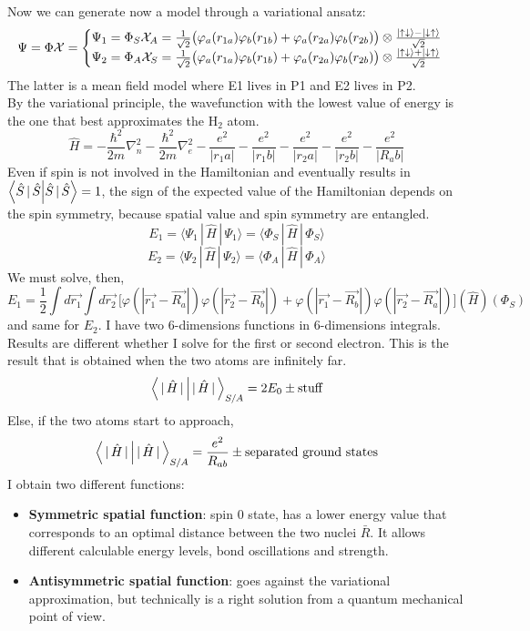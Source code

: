 Now we can generate now a model through a variational ansatz:
\[
\Psi=\Phi \mathcal{X}=\begin{cases}
\Psi_1=\Phi_S \mathcal{X}_A = \frac{1}{\sqrt{2}} \big(\varphi_a(r_{1a}) \varphi_b (r_{1b})+\varphi_a (r_{2a}) \varphi_b (r_{2b})\big) \otimes\frac{\ket{\uparrow\downarrow}-\ket{\downarrow\uparrow}}{\sqrt{2}}\\
\Psi_2=\Phi_A\mathcal{X}_S = \frac{1}{\sqrt{2}} \big(\varphi_a(r_{1a}) \varphi_b (r_{1b})+\varphi_a (r_{2a}) \varphi_b (r_{2b})\big) \otimes\frac{\ket{\uparrow\downarrow}+\ket{\downarrow\uparrow}}{\sqrt{2}}\\
\end{cases}
\]
The latter is a mean field model where E1 lives in P1 and E2 lives in P2.\\
By the variational principle, the wavefunction with the lowest value of energy is the one that best approximates the H$_2$ atom.\\
\[
\hat{H}=-\frac{\hbar^2}{2m}\nabla_n^2-\frac{\hbar^2}{2m}\nabla_e^2-\frac{e^2}{|r_1a|}-\frac{e^2}{|r_1b|}-\frac{e^2}{|r_2a|}-\frac{e^2}{|r_2b|}-\frac{e^2}{|R_ab|}
\]
Even if spin is not involved in the Hamiltonian and eventually results in $\braket{\hat{S}\,|\,\hat{S}}=1$, the sign of the expected value of the Hamiltonian depends on the spin symmetry, because spatial value and spin symmetry are entangled.
\[E_1=\langle{\Psi_1\,|\,\hat{H}\,|\,\Psi_1}\rangle =\langle{\Phi_S\,|\,\hat{H}\,|\,\Phi_S}\rangle\]
\[E_2=\langle{\Psi_2\,|\,\hat{H}\,|\,\Psi_2}\rangle=\langle{\Phi_A\,|\,\hat{H}\,|\,\Phi_A}\rangle\]
We must solve, then,
\[
E_1=\frac{1}{2}\int d\vec{r_1}\int d\vec{r_2}\,\big[\varphi(|\vec{r_1}-\vec{R_a}|)\varphi(|\vec{r_2}-\vec{R_b}|)+\varphi(|\vec{r_1}-\vec{R_b}|)\varphi(|\vec{r_2}-\vec{R_a}|)\big](\hat{H})(\Phi_S)
\]
and same for $E_2$. I have two 6-dimensions functions in 6-dimensions integrals.\\
Results are different whether I solve for the first or second electron. This is the result that is obtained when the two atoms are infinitely far.\\
\[
\braket{\,|\,\hat{H}\,|\,}_{S/A}=2E_0\pm\text{stuff}
\]
Else, if the two atoms start to approach,
\[
\braket{\,|\,\hat{H}\,|\,}_{S/A}=\frac{e^2}{R_{ab}}\pm\text{separated ground states}
\]
I obtain two different functions:
\begin{itemize}
	\item \textbf{Symmetric spatial function}: spin 0 state, has a lower energy value that corresponds to an optimal distance between the two nuclei $\bar{R}$. It allows different calculable energy levels, bond oscillations and strength.
	\item \textbf{Antisymmetric spatial function}: goes against the variational approximation, but technically is a right solution from a quantum mechanical point of view.
\end{itemize}

